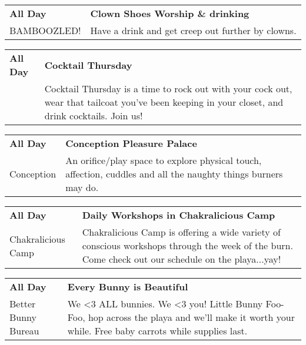 \begin{tabular}{ p{1in} p{2.2in} }
    \textbf{All Day} & \textbf{Clown Shoes Worship \& drinking} \\
    BAMBOOZLED! \newline  & Have a drink and get creep out further by clowns. \\
    \hline 
\end{tabular}
    
\begin{tabular}{ p{1in} p{2.2in} }
    \textbf{All Day} & \textbf{Cocktail Thursday} \\
    ~ \newline  & Cocktail Thursday is a time to rock out with your cock out, wear that tailcoat you've been keeping in your closet, and drink cocktails. Join us! \\
    \hline 
\end{tabular}
    
\begin{tabular}{ p{1in} p{2.2in} }
    \textbf{All Day} & \textbf{Conception Pleasure Palace} \\
    Conception \newline  & An orifice/play space to explore physical touch, affection, cuddles and all the naughty things burners may do. \\
    \hline 
\end{tabular}
    
\begin{tabular}{ p{1in} p{2.2in} }
    \textbf{All Day} & \textbf{Daily Workshops in Chakralicious Camp} \\
    Chakralicious Camp \newline  & Chakralicious Camp is offering a wide variety of conscious workshops through the week of the burn. Come check out our schedule on the playa...yay! \\
    \hline 
\end{tabular}
    
\begin{tabular}{ p{1in} p{2.2in} }
    \textbf{All Day} & \textbf{Every Bunny is Beautiful} \\
    Better Bunny Bureau \newline  & We <3 ALL bunnies. We <3 you! Little Bunny Foo-Foo, hop across the playa and we'll make it worth your while. Free baby carrots while supplies last. \\
    \hline 
\end{tabular}
    
